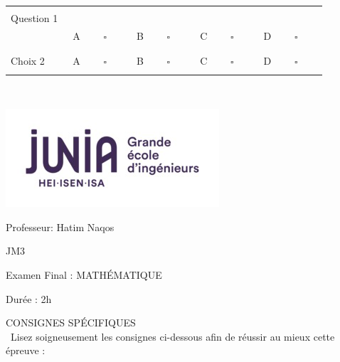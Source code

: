 \documentclass{book}%
\begin{document}
\begin{center}%
\begin{tabular}{| l l l l l |}%
\hline%
 & & & & \\%
Question 1\qquad \qquad\ & & & & \\%
 & A $\qquad \square \qquad$ & B $\qquad \square \qquad$ & C $\qquad \square \qquad$ & D $\qquad \square \qquad$ \\ %
 & & & &  \\%
\hline%
 & & & &  \\%
Choix 2 & A $\qquad \square \qquad$ & B $\qquad \square \qquad$ & C $\qquad \square \qquad$ & D $\qquad \square \qquad$ \\ %
 & & & &  \\%
\hline%
\end{tabular}%
\\ \vskip3mm%
\thispagestyle{empty}%
\end{center}%
\newpage%
\thispagestyle{empty}%
\vskip-40mm	\includegraphics[scale=0.5]{logo.png} \\%
 \begin{flushright}  \vskip-20mm   Professeur: Hatim Naqos\vskip15mm  \end{flushright}%
JM3%
\begin{center}   \begin{Large}Examen Final : MATHÉMATIQUE\end{Large} \end{center}%
Durée : 2h%
 \begin{center} { \large CONSIGNES SPÉCIFIQUES } \\\ Lisez soigneusement les consignes ci-dessous afin de réussir au mieux cette épreuve : \end{center} %
\end{document}
